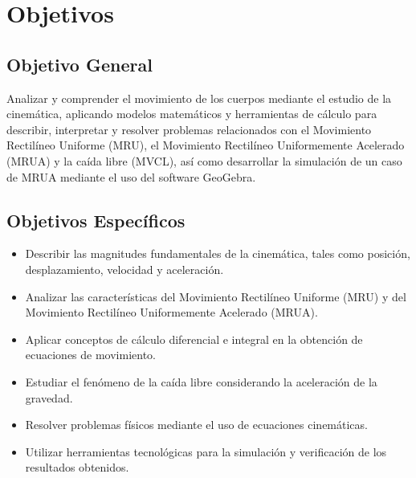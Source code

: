 \section{Objetivos}

\subsection{Objetivo General}

Analizar y comprender el movimiento de los cuerpos mediante el estudio de la cinemática, 
aplicando modelos matemáticos y herramientas de cálculo para describir, interpretar y resolver 
problemas relacionados con el Movimiento Rectilíneo Uniforme (MRU), el Movimiento Rectilíneo 
Uniformemente Acelerado (MRUA) y la caída libre (MVCL), así como desarrollar la simulación de un 
caso de MRUA mediante el uso del software GeoGebra.

\subsection{Objetivos Específicos}

\begin{itemize}
    \item Describir las magnitudes fundamentales de la cinemática, tales como posición, desplazamiento, velocidad y aceleración.
    \item Analizar las características del Movimiento Rectilíneo Uniforme (MRU) y del Movimiento Rectilíneo Uniformemente Acelerado (MRUA).
    \item Aplicar conceptos de cálculo diferencial e integral en la obtención de ecuaciones de movimiento.
    \item Estudiar el fenómeno de la caída libre considerando la aceleración de la gravedad.
    \item Resolver problemas físicos mediante el uso de ecuaciones cinemáticas.
    \item Utilizar herramientas tecnológicas para la simulación y verificación de los resultados obtenidos.
\end{itemize}